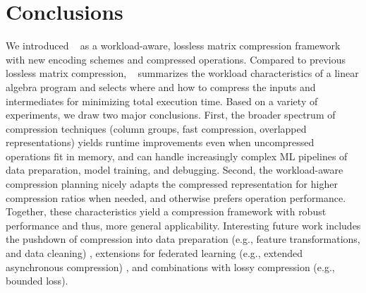 \section{Conclusions}
\label{sec:conclusion}

We introduced \name~ as a workload-aware, lossless matrix compression framework with new encoding schemes and compressed operations.
Compared to previous lossless matrix compression, \name~ summarizes the workload characteristics of a linear algebra program
and selects where and how to compress the inputs and intermediates for minimizing total execution time.
Based on a variety of experiments, we draw two major conclusions.
First, the broader spectrum of compression techniques (column groups, fast compression, overlapped representations) yields
runtime improvements even when uncompressed operations fit in memory, and can handle increasingly complex ML pipelines of data preparation,
model training, and debugging. Second, the workload-aware compression planning nicely adapts the compressed representation
for higher compression ratios when needed, and otherwise prefers operation performance.
Together, these characteristics yield a compression framework with robust performance and thus, more general applicability.
Interesting future work includes the pushdown of compression into data preparation (e.g., feature transformations, and data cleaning) \cite{XinMPP21}, extensions for federated learning (e.g., extended asynchronous compression) \cite{Baunsgaard0CDGG21, Baunsgaard0IKLO22}, and combinations with lossy compression (e.g., bounded loss\cite{JinZJFGLST2022,ChunbinEY20}).
